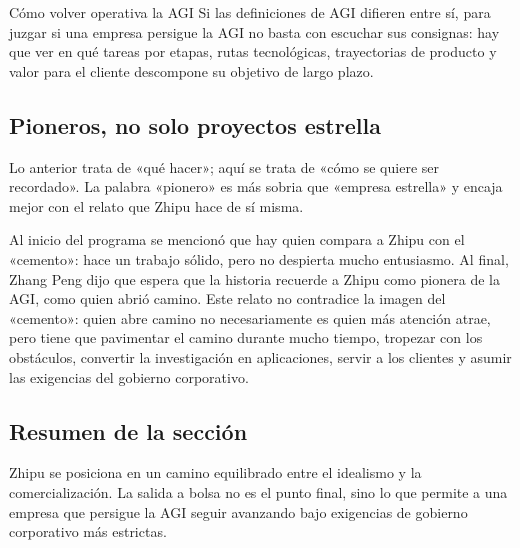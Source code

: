 \begin{importantbox}{Cómo volver operativa la AGI}
Si las definiciones de AGI difieren entre sí, para juzgar si una empresa persigue la AGI no basta con escuchar sus consignas: hay que ver en qué tareas por etapas, rutas tecnológicas, trayectorias de producto y valor para el cliente descompone su objetivo de largo plazo.
\end{importantbox}

\subsection{Pioneros, no solo proyectos estrella}

Lo anterior trata de «qué hacer»; aquí se trata de «cómo se quiere ser recordado». La palabra «pionero» es más sobria que «empresa estrella» y encaja mejor con el relato que Zhipu hace de sí misma.

Al inicio del programa se mencionó que hay quien compara a Zhipu con el «cemento»: hace un trabajo sólido, pero no despierta mucho entusiasmo. Al final, Zhang Peng dijo que espera que la historia recuerde a Zhipu como pionera de la AGI, como quien abrió camino. Este relato no contradice la imagen del «cemento»: quien abre camino no necesariamente es quien más atención atrae, pero tiene que pavimentar el camino durante mucho tiempo, tropezar con los obstáculos, convertir la investigación en aplicaciones, servir a los clientes y asumir las exigencias del gobierno corporativo.

\subsection{Resumen de la sección}

Zhipu se posiciona en un camino equilibrado entre el idealismo y la comercialización. La salida a bolsa no es el punto final, sino lo que permite a una empresa que persigue la AGI seguir avanzando bajo exigencias de gobierno corporativo más estrictas.

